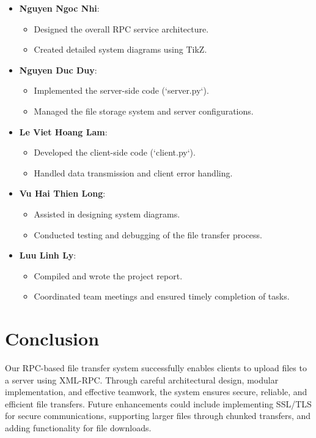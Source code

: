 \documentclass[12pt]{article}
\begin{document}
\begin{itemize}
    \item \textbf{Nguyen Ngoc Nhi}:
    \begin{itemize}
        \item Designed the overall RPC service architecture.
        \item Created detailed system diagrams using TikZ.
    \end{itemize}
    
    \item \textbf{Nguyen Duc Duy}:
    \begin{itemize}
        \item Implemented the server-side code (`server.py`).
        \item Managed the file storage system and server configurations.
    \end{itemize}
    
    \item \textbf{Le Viet Hoang Lam}:
    \begin{itemize}
        \item Developed the client-side code (`client.py`).
        \item Handled data transmission and client error handling.
    \end{itemize}
    
    \item \textbf{Vu Hai Thien Long}:
    \begin{itemize}
        \item Assisted in designing system diagrams.
        \item Conducted testing and debugging of the file transfer process.
    \end{itemize}
    
    \item \textbf{Luu Linh Ly}:
    \begin{itemize}
        \item Compiled and wrote the project report.
        \item Coordinated team meetings and ensured timely completion of tasks.
    \end{itemize}
\end{itemize}

\section{Conclusion}
Our RPC-based file transfer system successfully enables clients to upload files to a server using XML-RPC. Through careful architectural design, modular implementation, and effective teamwork, the system ensures secure, reliable, and efficient file transfers. Future enhancements could include implementing SSL/TLS for secure communications, supporting larger files through chunked transfers, and adding functionality for file downloads.
\end{document}
